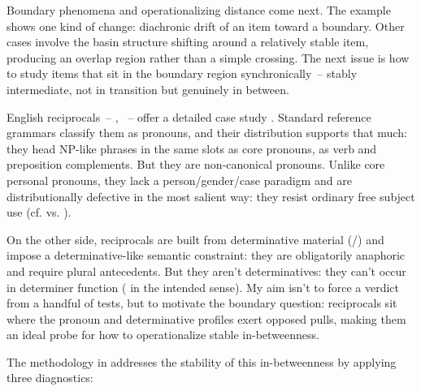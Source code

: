 Boundary phenomena and operationalizing distance come next. The  example shows one kind of change: diachronic drift of an item toward a boundary. Other cases involve the basin structure shifting around a relatively stable item, producing an overlap region rather than a simple crossing. The next issue is how to study items that sit in the boundary region synchronically~-- stably intermediate, not in transition but genuinely in between.

English reciprocals~-- , ~-- offer a detailed case study \citep{reynolds2025reciprocals}. Standard reference grammars classify them as pronouns, and their distribution supports that much: they head NP-like phrases in the same slots as core pronouns, as verb and preposition complements. But they are non-canonical pronouns. Unlike core personal pronouns, they lack a person/gender/case paradigm and are distributionally defective in the most salient way: they resist ordinary free subject use (cf.  vs. ). 

On the other side, reciprocals are built from determinative material (/) and impose a determinative-like semantic constraint: they are obligatorily anaphoric and require plural antecedents. But they aren't determinatives: they can't occur in determiner function (\ungram{} in the intended sense). My aim isn't to force a verdict from a handful of tests, but to motivate the boundary question: reciprocals sit where the pronoun and determinative profiles exert opposed pulls, making them an ideal probe for how to operationalize stable in-betweenness.

The methodology in \textcite{reynolds2025reciprocals} addresses the stability of this in-betweenness by applying three diagnostics:

